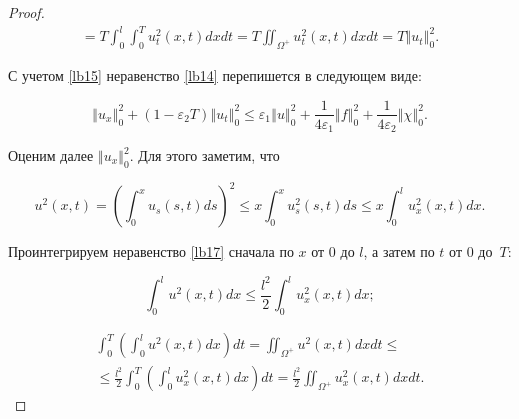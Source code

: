 \begin{proof}
\begin{multline}
\label{lb15}

=T \int _{0}^{l} \int _{0}^{T} u_{t}^{2}(x, t)dx dt=

T \iint _{\Omega^{+}}u_{t}^{2}(x, t)dx dt=T \left\Vert u_{t} \right\Vert_{0}^{2}.

\end{multline}



С учетом \eqref{lb15} неравенство \eqref{lb14} перепишется в следующем виде:

\begin{equation}

\label{lb16}

\left\Vert u_{x} \right\Vert_{0}^{2}+\left(1-\varepsilon_2 T\right) \left\Vert u_{t} \right\Vert_{0}^{2}\leqslant \varepsilon_1 \left\Vert u \right\Vert_{0}^{2}+\frac{1}{4\varepsilon_1} \left\Vert f \right\Vert_{0}^{2}+\frac{1}{4\varepsilon_2} \left\Vert \chi \right\Vert_{0}^{2}.

\end{equation}

Оценим далее $\left\Vert u_{x} \right\Vert_{0}^{2}$. Для этого заметим, что

\begin{equation}

\label{lb17}

u^2 (x, t)=\left(\int _{0}^{x} u_s \left(s,t\right)ds\right)^2 \leqslant 

x \int _{0}^{x} u_{s}^{2} \left(s,t\right)ds \leqslant x \int _{0}^{l} u_{x}^{2} (x, t)dx.

\end{equation}

Проинтегрируем неравенство \eqref{lb17} сначала по $x$ от 0 до $l$, а затем по $t$ от 0 до~$T$:

\begin{equation}

\label{lb18}

\int _{0}^{l} u^2 (x, t)dx \leqslant \frac{l^2}{2} \int _{0}^{l} u_{x}^{2} (x, t)dx;

\end{equation}

\begin{multline}

\int _{0}^{T}\left(\int _{0}^{l} u^2(x, t)dx\right) dt=\iint _{\Omega^{+}}u^{2}(x, t)dx dt \leqslant

\\

\label{lb19}

\leqslant \frac{l^2}{2} \int _{0}^{T}\left(\int _{0}^{l} u_{x}^{2}(x, t)dx\right) dt= \frac{l^2}{2} \iint _{\Omega^{+}} u_{x}^{2}(x, t)dx dt.


\end{multline}
\end{proof}
